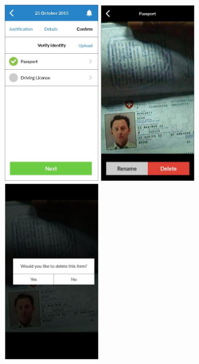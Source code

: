 \begin{figure}
  \subfigures
  \centering
  \begin{minipage}{4.6cm}
    \centering
    \includegraphics[width=4.2cm]{inc/ui_takedown_step12a.jpg}
    \caption{}
    \label{fig:ui_takedown_step12a}
  \end{minipage}
  \begin{minipage}{4.6cm}
    \centering
    \includegraphics[width=4.2cm]{inc/ui_takedown_step12b.jpg}
    \caption{}
    \label{fig:ui_takedown_step12b}
  \end{minipage}
  \begin{minipage}{4.6cm}
    \centering
    \includegraphics[width=4.2cm]{inc/ui_takedown_step12c.jpg}
    \caption{}
    \label{fig:ui_takedown_step12c}
  \end{minipage}
\end{figure}

